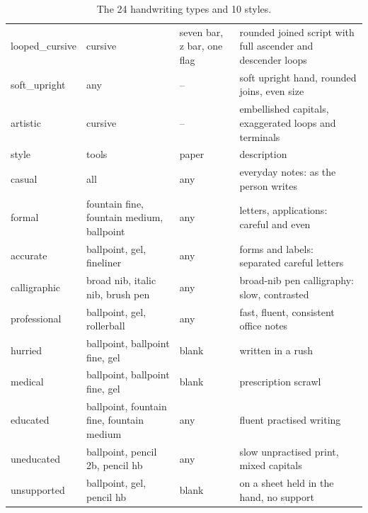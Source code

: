 \begin{table}[h]
\begin{tabular}{lllp{}}
looped\_cursive & cursive & seven bar, z bar, one flag & rounded joined script with full ascender and descender loops\\
soft\_upright & any & -- & soft upright hand, rounded joins, even size\\
artistic & cursive & -- & embellished capitals, exaggerated loops and terminals\\
\midrule style & tools & paper & description\\\midrule
casual & all & any & everyday notes: as the person writes\\
formal & fountain fine, fountain medium, ballpoint & any & letters, applications: careful and even\\
accurate & ballpoint, gel, fineliner & any & forms and labels: separated careful letters\\
calligraphic & broad nib, italic nib, brush pen & any & broad-nib pen calligraphy: slow, contrasted\\
professional & ballpoint, gel, rollerball & any & fast, fluent, consistent office notes\\
hurried & ballpoint, ballpoint fine, gel & blank & written in a rush\\
medical & ballpoint, ballpoint fine, gel & blank & prescription scrawl\\
educated & ballpoint, fountain fine, fountain medium & any & fluent practised writing\\
uneducated & ballpoint, pencil 2b, pencil hb & any & slow unpractised print, mixed capitals\\
unsupported & ballpoint, gel, pencil hb & blank & on a sheet held in the hand, no support\\
\bottomrule\end{tabular}
\caption{The 24 handwriting types and 10 styles.}
\label{tab:types}\end{table}
